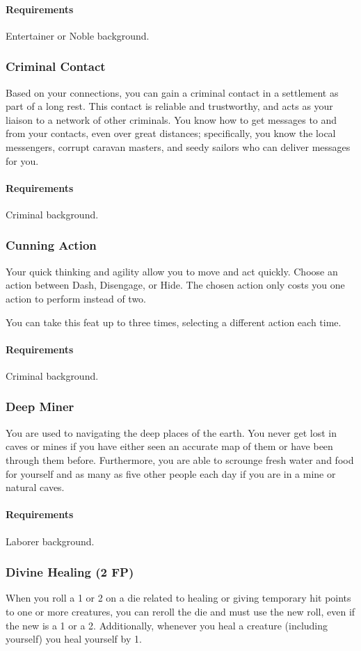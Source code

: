     \paragraph{Requirements} Entertainer or Noble background.
\subsubsection{Criminal Contact} \label{feat::criminalcontact}
    Based on your connections, you can gain a criminal contact in a settlement as part of a long rest.
    This contact is reliable and trustworthy, and acts as your liaison to a network of other criminals.
    You know how to get messages to and from your contacts, even over great distances; specifically, you know the local messengers, corrupt caravan masters, and seedy sailors who can deliver messages for you.
    \paragraph{Requirements} Criminal background.
\subsubsection{Cunning Action} \label{feat::cunningaction}
    Your quick thinking and agility allow you to move and act quickly.
    Choose an action between Dash, Disengage, or Hide.
    The chosen action only costs you one action to perform instead of two.

    You can take this feat up to three times, selecting a different action each time.
    \paragraph{Requirements} Criminal background.
\subsubsection{Deep Miner} \label{feat::deepminer}
    You are used to navigating the deep places of the earth.
    You never get lost in caves or mines if you have either seen an accurate map of them or have been through them before.
    Furthermore, you are able to scrounge fresh water and food for yourself and as many as five other people each day if you are in a mine or natural caves.
    \paragraph{Requirements} Laborer background.
\subsubsection{Divine Healing (2 FP)} \label{feat::divinehealing}
    When you roll a 1 or 2 on a die related to healing or giving temporary hit points to one or more creatures, you can reroll the die and must use the new roll, even if the new is a 1 or a 2.
    Additionally, whenever you heal a creature (including yourself) you heal yourself by 1.
